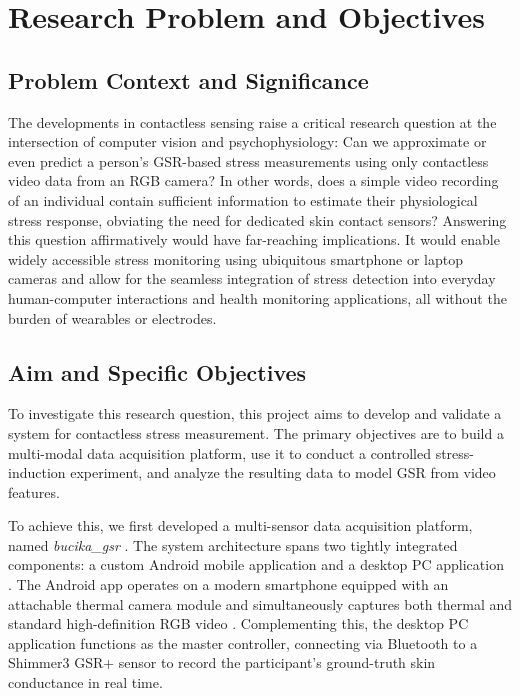 \section{Research Problem and Objectives}

\subsection{Problem Context and Significance}

The developments in contactless sensing raise a critical research question at
the intersection of computer vision and psychophysiology: Can we approximate or
even predict a person's GSR-based stress measurements using only contactless
video data from an RGB camera? In other words, does a simple video recording of
an individual contain sufficient information to estimate their physiological
stress response, obviating the need for dedicated skin contact sensors?
Answering this question affirmatively would have far-reaching implications. It
would enable widely accessible stress monitoring using ubiquitous smartphone or
laptop cameras and allow for the seamless integration of stress detection into
everyday human-computer interactions and health monitoring applications, all
without the burden of wearables or electrodes.

\subsection{Aim and Specific Objectives}

To investigate this research question, this project aims to develop and validate
a system for contactless stress measurement. The primary objectives are to build
a multi-modal data acquisition platform, use it to conduct a controlled
stress-induction experiment, and analyze the resulting data to model GSR from
video features.

To achieve this, we first developed a multi-sensor data acquisition platform, named \textit{bucika\_gsr}
.
The system architecture spans two tightly integrated components: a custom Android mobile application and a desktop PC application
.
The Android app operates on a modern smartphone equipped with an attachable thermal camera module and simultaneously captures both thermal and standard high-definition RGB video
.
Complementing this, the desktop PC application functions as the master controller, connecting via Bluetooth to a Shimmer3 GSR+ sensor to record the participant's ground-truth skin conductance in real time.

